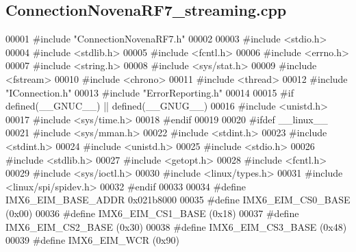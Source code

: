 \subsection{Connection\+Novena\+R\+F7\+\_\+streaming.\+cpp}
\label{ConnectionNovenaRF7__streaming_8cpp_source}

\begin{DoxyCode}
00001 \textcolor{preprocessor}{#include "ConnectionNovenaRF7.h"}
00002 
00003 \textcolor{preprocessor}{#include <stdio.h>}
00004 \textcolor{preprocessor}{#include <stdlib.h>}
00005 \textcolor{preprocessor}{#include <fcntl.h>}
00006 \textcolor{preprocessor}{#include <errno.h>}
00007 \textcolor{preprocessor}{#include <string.h>}
00008 \textcolor{preprocessor}{#include <sys/stat.h>}
00009 \textcolor{preprocessor}{#include <fstream>}
00010 \textcolor{preprocessor}{#include <chrono>}
00011 \textcolor{preprocessor}{#include <thread>}
00012 \textcolor{preprocessor}{#include "IConnection.h"}
00013 \textcolor{preprocessor}{#include "ErrorReporting.h"}
00014 
00015 \textcolor{preprocessor}{#if defined(\_\_GNUC\_\_) || defined(\_\_GNUG\_\_)}
00016 \textcolor{preprocessor}{#include <unistd.h>}
00017 \textcolor{preprocessor}{#include <sys/time.h>}
00018 \textcolor{preprocessor}{#endif}
00019 
00020 \textcolor{preprocessor}{#ifdef \_\_linux\_\_}
00021 \textcolor{preprocessor}{#include <sys/mman.h>}
00022 \textcolor{preprocessor}{#include <stdint.h>}
00023 \textcolor{preprocessor}{#include <stdint.h>}
00024 \textcolor{preprocessor}{#include <unistd.h>}
00025 \textcolor{preprocessor}{#include <stdio.h>}
00026 \textcolor{preprocessor}{#include <stdlib.h>}
00027 \textcolor{preprocessor}{#include <getopt.h>}
00028 \textcolor{preprocessor}{#include <fcntl.h>}
00029 \textcolor{preprocessor}{#include <sys/ioctl.h>}
00030 \textcolor{preprocessor}{#include <linux/types.h>}
00031 \textcolor{preprocessor}{#include <linux/spi/spidev.h>}
00032 \textcolor{preprocessor}{#endif}
00033 
00034 \textcolor{preprocessor}{#define IMX6\_EIM\_BASE\_ADDR 0x021b8000}
00035 \textcolor{preprocessor}{#define IMX6\_EIM\_CS0\_BASE (0x00)}
00036 \textcolor{preprocessor}{#define IMX6\_EIM\_CS1\_BASE (0x18)}
00037 \textcolor{preprocessor}{#define IMX6\_EIM\_CS2\_BASE (0x30)}
00038 \textcolor{preprocessor}{#define IMX6\_EIM\_CS3\_BASE (0x48)}
00039 \textcolor{preprocessor}{#define IMX6\_EIM\_WCR (0x90)}

\end{DoxyCode}
